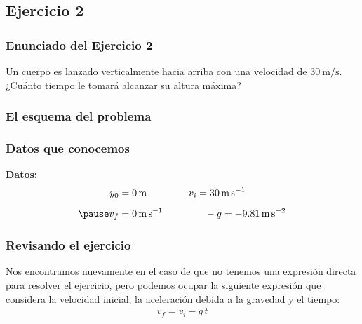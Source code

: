 \documentclass[14pt]{beamer}
\begin{document}
\subsection*{Ejercicio 2}

\begin{frame}
\frametitle{Enunciado del Ejercicio 2}
Un cuerpo es lanzado verticalmente hacia arriba con una velocidad de $\SI{30}{\meter\per\second}$.
\\
\bigskip
\pause
¿Cuánto tiempo le tomará alcanzar su altura máxima?
\end{frame}
\begin{frame}
\frametitle{El esquema del problema}
\begin{figure}    
    \centering
\end{figure}
\end{frame}
\begin{frame}
\frametitle{Datos que conocemos}
\textbf{Datos:}
\pause
\begin{eqnarray*}
\begin{aligned}
y_{0} &= \SI{0}{\meter} \hspace{1.5cm} v_{i} = \SI{30}{\meter\per\second} \\[0.5em] \pause
v_{f} &= \SI{0}{\meter\per\second} \hspace{1.5cm} - g = - \SI{9.81}{\meter\per\square\second}
\end{aligned}
\end{eqnarray*}
\end{frame}
\begin{frame}
\frametitle{Revisando el ejercicio}
Nos encontramos nuevamente en el caso de que no tenemos una expresión directa para resolver el ejercicio, \pause pero podemos ocupar la siguiente expresión que considera la velocidad inicial, la aceleración debida a la gravedad y el tiempo:
\pause
\begin{align*}
v_{f} = v_{i} - g \, t
\end{align*}
\end{frame}
\end{document}
